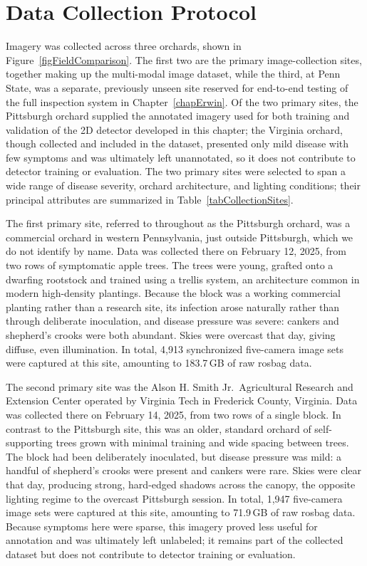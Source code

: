 \section{Data Collection Protocol} \label{secDataCollection}

Imagery was collected across three orchards, shown in
Figure~\ref{figFieldComparison}.
The first two are the primary image-collection sites, together
making up the multi-modal image dataset, while the third, at Penn
State, was a separate, previously unseen site reserved for
end-to-end testing of the full inspection system in
Chapter~\ref{chapErwin}.
Of the two primary sites, the Pittsburgh orchard supplied the
annotated imagery used for both training and validation of the 2D
detector developed in this chapter; the Virginia orchard, though
collected and included in the dataset, presented only mild disease
with few symptoms and was ultimately left unannotated, so it does
not contribute to detector training or evaluation.
The two primary sites were selected to span a wide range of disease
severity, orchard architecture, and lighting conditions; their
principal attributes are summarized in
Table~\ref{tabCollectionSites}.

The first primary site, referred to throughout as the Pittsburgh
orchard, was a commercial orchard in western Pennsylvania, just
outside Pittsburgh, which we do not identify by name.
Data was collected there on February 12, 2025, from two rows of
symptomatic apple trees.
The trees were young, grafted onto a dwarfing rootstock and
trained using a trellis system, an architecture common in modern
high-density plantings.
Because the block was a working commercial planting rather than a
research site, its infection arose naturally rather than through
deliberate inoculation, and disease pressure was severe: cankers
and shepherd's crooks were both abundant.
Skies were overcast that day, giving diffuse, even illumination.
In total, 4{,}913 synchronized five-camera image sets were captured
at this site, amounting to 183.7\,GB of raw rosbag data.

The second primary site was the Alson H. Smith Jr.\ Agricultural
Research and Extension Center operated by Virginia Tech in Frederick
County, Virginia.
Data was collected there on February 14, 2025, from two rows of a
single block.
In contrast to the Pittsburgh site, this was an older, standard
orchard of self-supporting trees grown with minimal training and
wide spacing between trees.
The block had been deliberately inoculated, but disease pressure was
mild: a handful of shepherd's crooks were present and cankers were rare.
Skies were clear that day, producing strong, hard-edged shadows
across the canopy, the opposite lighting regime to the overcast
Pittsburgh session.
In total, 1{,}947 five-camera image sets were captured at this site,
amounting to 71.9\,GB of raw rosbag data.
Because symptoms here were sparse, this imagery proved less useful
for annotation and was ultimately left unlabeled; it remains part
of the collected dataset but does not contribute to detector
training or evaluation.

